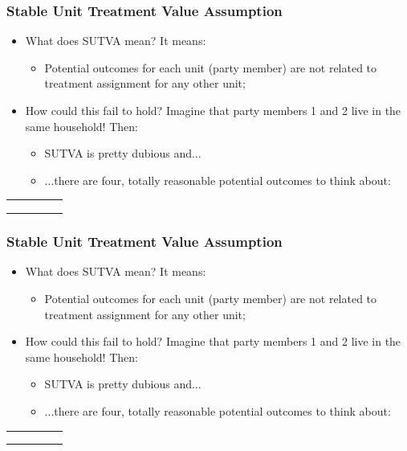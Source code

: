 \documentclass[aspectratio=169]{beamer}
\theoremstyle{principle}
\begin{document}
\begin{frame}
\frametitle{Stable Unit Treatment Value Assumption}
\begin{itemize}
\item What does SUTVA mean?  \color{white}It means:
\begin{itemize}
\item[]\color{white} Potential outcomes for each unit (party member) are not related to treatment assignment for any other unit;
\end{itemize}
\bigskip
\item\color{black} How could this fail to hold? \color{white} Imagine that party members 1 and 2 live in the same household!  Then:
\begin{itemize} 
\item[]\color{white} SUTVA is pretty dubious and...
\item[]\color{white} ...there are four, totally reasonable potential outcomes to think about:
\end{itemize}
\end{itemize}
\Large\vspace{8mm}
\begin{table}
\begin{tabular}{ccccc}
 &&&&\\
&&&&\\
&&&&\\
\end{tabular}
\end{table}

\end{frame}

\begin{frame}
\frametitle{Stable Unit Treatment Value Assumption}
\begin{itemize}
\item What does SUTVA mean?  It means:
\begin{itemize}
\item Potential outcomes for each unit (party member) are not related to treatment assignment for any other unit;
\end{itemize}
\bigskip
\item\color{black} How could this fail to hold? \color{white} Imagine that party members 1 and 2 live in the same household!  Then:
\begin{itemize} 
\item[]\color{white} SUTVA is pretty dubious and...
\item[]\color{white} ...there are four, totally reasonable potential outcomes to think about:
\end{itemize}
\end{itemize}
\Large\vspace{8mm}
\begin{table}
\begin{tabular}{ccccc}
 &&&&\\
&&&&\\
&&&&\\
\end{tabular}
\end{table}

\end{frame}
\end{document}
